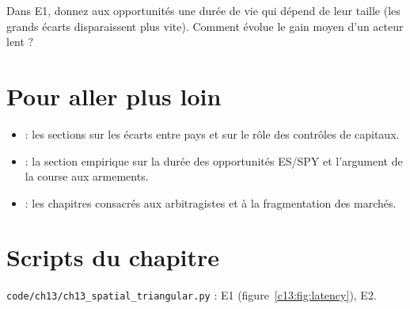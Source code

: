 \begin{exercise}[à coder]
Dans E1, donnez aux opportunités une durée de vie qui dépend de leur taille (les grands écarts disparaissent plus vite). Comment évolue le gain moyen d'un acteur lent ?
\end{exercise}

\section{Pour aller plus loin}

\begin{toread}
\begin{itemize}[leftmargin=1.2em]
\item \citet{makarov2020} : les sections sur les écarts entre pays et sur le rôle des contrôles de capitaux.
\item \citet{budish2015} : la section empirique sur la durée des opportunités ES/SPY et l'argument de la course aux armements.
\item \citet{harris2003} : les chapitres consacrés aux arbitragistes et à la fragmentation des marchés.
\end{itemize}
\end{toread}

\section{Scripts du chapitre}
\noindent\texttt{code/ch13/ch13\_spatial\_triangular.py} : E1 (figure~\ref{c13:fig:latency}), E2.
